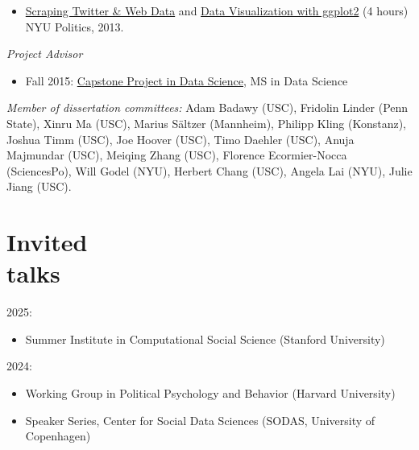 \documentclass[margin,line,11pt]{resume}
\begin{document}
\begin{resume}
\begin{itemize}
\begin{itemize}
\item Georgetown University, 2015
\vspace{-.1cm}
\item University of Cologne, 2017
\vspace{-.1cm}
\item London School of Economics, 2018
\end{itemize}
\item \href{https://github.com/pablobarbera/workshop}{Scraping Twitter \& Web Data} and \href{https://github.com/pablobarbera/Rdataviz}{Data Visualization with ggplot2} (4 hours) NYU Politics, 2013.
\end{itemize}

\emph{Project Advisor}
\begin{itemize}
\item Fall 2015: \href{http://cds.nyu.edu/academics/ms-in-data-science/curriculum/required-courses/#ds-ga-1006}{Capstone Project in Data Science}, MS in Data Science
\end{itemize}

\emph{Member of dissertation committees:} Adam Badawy (USC), Fridolin Linder (Penn State), Xinru Ma (USC), Marius S\"{a}ltzer (Mannheim), Philipp Kling (Konstanz), Joshua Timm (USC), Joe Hoover (USC), Timo Daehler (USC), Anuja Majmundar (USC), Meiqing Zhang (USC), Florence Ecormier-Nocca (SciencesPo), Will Godel (NYU), Herbert Chang (USC), Angela Lai (NYU), Julie Jiang (USC).


        \section{\mysidestyle Invited\\talks}

2025:
\begin{itemize}
\item Summer Institute in Computational Social Science (Stanford University)
\end{itemize}


2024:
\begin{itemize}
\item Working Group in Political Psychology and Behavior (Harvard University)
\item Speaker Series, Center for Social Data Sciences (SODAS, University of Copenhagen)
\end{itemize}


\end{resume}
\end{document}
